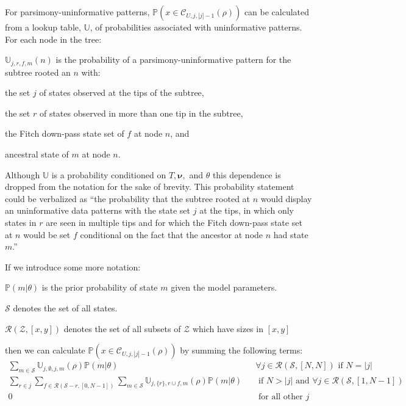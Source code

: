 \documentclass[11pt]{article}
\newcommand{\treeRoot}{\ensuremath{\rho}\xspace}
\newcommand{\uninform}{\ensuremath{U}\xspace}
\newcommand{\numLeavesTotal}{\ensuremath{N}\xspace}
\newcommand{\allStates}{\ensuremath{\mathcal S}\xspace}
\newcommand{\edgeLengths}{\ensuremath{\bm \nu}\xspace}
\newcommand{\patProbSym}{\ensuremath{\mathbb P}\xspace}
\renewcommand{\Pr}{\patProbSym}
\newcommand{\patClassSym}{\ensuremath{\mathcal C}\xspace}
\newcommand{\patClass}[3]{\ensuremath{\patClassSym_{#1,#2,#3}}\xspace}
\newcommand{\probUninformPatClassSym}{\ensuremath{\mathbb U}\xspace}
\newcommand{\probUninformPatClass}[5]{\ensuremath{\probUninformPatClassSym_{#1,#2,#3,#4}\left(#5\right)}\xspace}
\newcommand{\subsetsOfSizeSet}[3]{\ensuremath{\mathcal R}\left(#1,\left[#2,#3\right]\right)\xspace}
\begin{document}
For parsimony-uninformative patterns, $\Pr(x\in\patClass{\uninform}{j}{|j|-1}(\treeRoot))$ can be calculated from a lookup table, $\probUninformPatClassSym$, of probabilities associated with uninformative patterns.
For each node in the tree:
\begin{compactitem}
	\item $\probUninformPatClass{j}{r}{f}{m}{n}$ is the probability of a parsimony-uninformative pattern for the subtree rooted an $n$ with:
		\begin{compactitem}
			\item the set $j$ of states observed at the tips of the subtree,
			\item the set $r$ of states observed in more than one tip in the subtree,
			\item the Fitch down-pass state set of $f$ at node $n$, and
			\item ancestral state of $m$ at node $n$.
		\end{compactitem}
		Although \probUninformPatClassSym is a probability conditioned on $T, \edgeLengths,$ and $\theta$ this dependence is dropped from the notation for the sake of brevity.
		This probability statement could be verbalized as ``the probability that the subtree rooted at $n$ would display an uninformative data patterns with the state set $j$ at the tips, in which only states in $r$ are seen in multiple tips and for which the Fitch down-pass state set at $n$ would be set $f$ conditional on the fact that the ancestor at node $n$ had state $m$.''
\end{compactitem}
If we introduce some more notation:
\begin{compactitem}
	\item $\Pr(m|\theta)$ is the prior probability of state $m$ given the model parameters.
	\item \allStates denotes the set of all states.
	\item $\subsetsOfSizeSet{\mathcal{Z}}{x}{y}$ denotes the set of all subsets of ${\mathcal Z}$ which have sizes in $[x,y]$
\end{compactitem}
then we can calculate $\Pr(x\in\patClass{\uninform}{j}{|j|-1}(\treeRoot))$ by summing the following terms:
\begin{eqnarray}
   \sum_{m\in\allStates}\probUninformPatClass{j}{\emptyset}{j}{m}{\treeRoot}\Pr(m|\theta) && 	\forall j \in  \subsetsOfSizeSet{\allStates}{\numLeavesTotal}{\numLeavesTotal} \mbox{ if } N = |j|  \label{noRepeatedStates}\\
  \sum_{r\in j}\sum_{f\in\subsetsOfSizeSet{\allStates-r}{0}{\numLeavesTotal-1}}\sum_{m\in\allStates}\probUninformPatClass{j}{\{r\}}{r\cup f}{m}{\treeRoot}\Pr(m|\theta)  &&  \mbox{ if } N > |j| \mbox{ and }\forall j \in  \subsetsOfSizeSet{\allStates}{1}{\numLeavesTotal-1}\label{oneRepeatedState}\\
  0 && \mbox{ for all other } j \mbox{}
\end{eqnarray}
\end{document}
